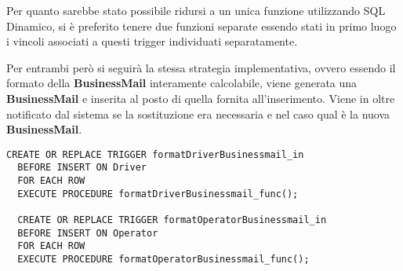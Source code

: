 Per quanto sarebbe stato possibile ridursi a un unica funzione utilizzando SQL Dinamico, si è preferito tenere due funzioni separate essendo stati in primo luogo i vincoli associati a questi trigger individuati separatamente.

Per entrambi però si seguirà la stessa strategia implementativa, ovvero essendo il formato della \textbf{BusinessMail} interamente calcolabile, viene generata una \textbf{BusinessMail} e inserita al posto di quella fornita all'inserimento. 
Viene in oltre notificato dal sistema se la sostituzione era necessaria e nel caso qual è la nuova \textbf{BusinessMail}.

\begin{lstlisting}[caption={Trigger per i vincoli \textbf{formatDriverBusinessmail} e \textbf{formatOperatorBusinessmail}}]
  CREATE OR REPLACE TRIGGER formatDriverBusinessmail_in
  BEFORE INSERT ON Driver
  FOR EACH ROW
  EXECUTE PROCEDURE formatDriverBusinessmail_func();

  CREATE OR REPLACE TRIGGER formatOperatorBusinessmail_in
  BEFORE INSERT ON Operator
  FOR EACH ROW
  EXECUTE PROCEDURE formatOperatorBusinessmail_func();
\end{lstlisting}

\newpage

